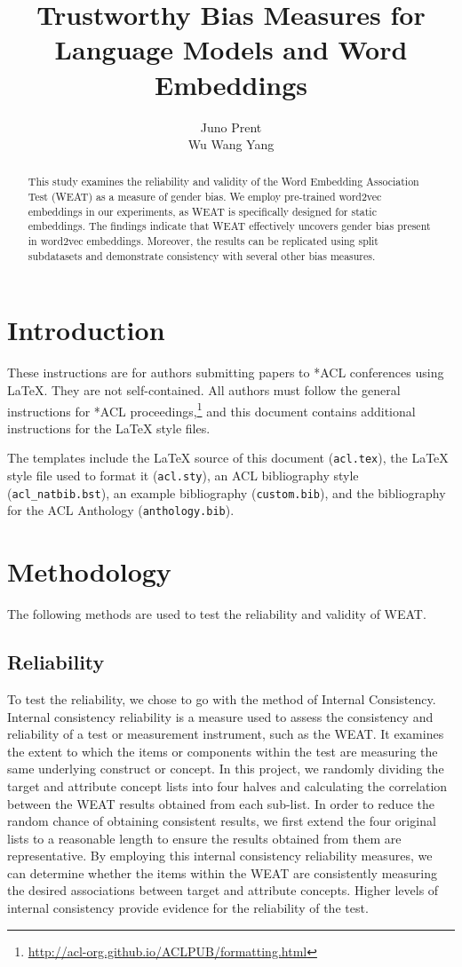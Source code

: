 \documentclass[11pt]{article}
\title{Trustworthy Bias Measures for Language Models and Word Embeddings}
\author{Juno Prent \\ Wu Wang Yang}
\begin{document}
\maketitle
\begin{abstract}
This study examines the reliability and validity of the Word Embedding Association Test (WEAT) as a measure of gender bias. We employ pre-trained word2vec embeddings in our experiments, as WEAT is specifically designed for static embeddings. The findings indicate that WEAT effectively uncovers gender bias present in word2vec embeddings. Moreover, the results can be replicated using split subdatasets and demonstrate consistency with several other bias measures.
\end{abstract}

\section{Introduction}

These instructions are for authors submitting papers to *ACL conferences using \LaTeX. They are not self-contained. All authors must follow the general instructions for *ACL proceedings,\footnote{\url{http://acl-org.github.io/ACLPUB/formatting.html}} and this document contains additional instructions for the \LaTeX{} style files.

The templates include the \LaTeX{} source of this document (\texttt{acl.tex}),
the \LaTeX{} style file used to format it (\texttt{acl.sty}),
an ACL bibliography style (\texttt{acl\_natbib.bst}),
an example bibliography (\texttt{custom.bib}),
and the bibliography for the ACL Anthology (\texttt{anthology.bib}).

\section{Methodology}
The following methods are used to test the reliability and validity of WEAT.

 
\subsection{Reliability}
To test the reliability, we chose to go with the method of Internal Consistency. Internal consistency reliability is a measure used to assess the consistency and reliability of a test or measurement instrument, such as the WEAT. It examines the extent to which the items or components within the test are measuring the same underlying construct or concept. In this project, we randomly dividing the target and attribute concept lists into four halves and calculating the correlation between the WEAT results obtained from each sub-list. In order to reduce the random chance of obtaining consistent results, we first extend the four original lists to a reasonable length to ensure the results obtained from them are representative. By employing this internal consistency reliability measures, we can determine whether the items within the WEAT are consistently measuring the desired associations between target and attribute concepts. Higher levels of internal consistency provide evidence for the reliability of the test.
\end{document}
